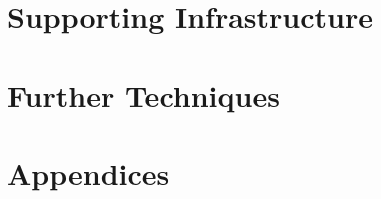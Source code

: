 \documentclass[12pt]{article}
\begin{document}








\part{Supporting Infrastructure}






\part{Further Techniques}





\appendix
\part{Appendices}




\clearpage


\clearpage
{}
{}
\end{document}
